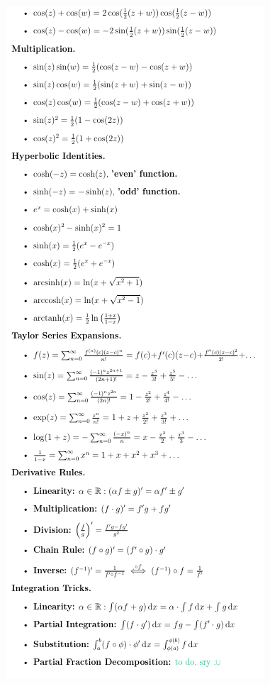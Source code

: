 \documentclass[8pt]{article}
\begin{document}
\begin{multicols*}{3}
\begin{minipage}{\linewidth-2cm}
    \end{minipage}
    \columnbreak
    \newpage
    $\;$ \\
    $\;$ \\
    \begin{minipage}{\linewidth-2cm}
      \includegraphics[width=\linewidth]{./media/Useful_Integrals_and_Identities_2.png}
    \end{minipage}
\end{multicols*}
\end{document}
